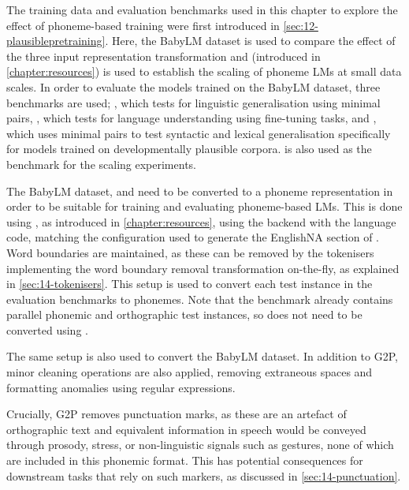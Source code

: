 The training data and evaluation benchmarks used in this chapter to explore the effect of phoneme-based training were first introduced in \cref{sec:12-plausiblepretraining}. Here, the BabyLM dataset is used to compare the effect of the three input representation transformation and \ipachildes (introduced in \cref{chapter:resources}) is used to establish the scaling of phoneme LMs at small data scales. In order to evaluate the models trained on the BabyLM dataset, three benchmarks are used; \blimp, which tests for linguistic generalisation using minimal pairs, \glue, which tests for language understanding using fine-tuning tasks, and \babyslm, which uses minimal pairs to test syntactic and lexical generalisation specifically for models trained on developmentally plausible corpora. \babyslm is also used as the benchmark for the scaling experiments.

The BabyLM dataset, \blimp and \glue need to be converted to a phoneme representation in order to be suitable for training and evaluating phoneme-based LMs. This is done using \gpp, as introduced in \cref{chapter:resources}, using the \phonemizer backend with the  language code, matching the configuration used to generate the EnglishNA section of \ipachildes. Word boundaries are maintained, as these can be removed by the tokenisers implementing the word boundary removal transformation on-the-fly, as explained in \cref{sec:14-tokenisers}. This setup is used to convert each test instance in the evaluation benchmarks to phonemes. Note that the \babyslm benchmark already contains parallel phonemic and orthographic test instances, so does not need to be converted using \gpp.

The same setup is also used to convert the BabyLM dataset. In addition to G2P, minor cleaning operations are also applied, removing extraneous spaces and formatting anomalies using regular expressions.%

Crucially, G2P removes punctuation marks, as these are an artefact of orthographic text and equivalent information in speech would be conveyed through prosody, stress, or non-linguistic signals such as gestures, none of which are included in this phonemic format. This has potential consequences for downstream tasks that rely on such markers, as discussed in \cref{sec:14-punctuation}.

